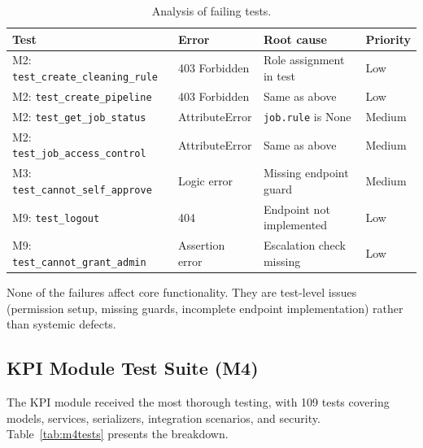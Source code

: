 \begin{table}[h!]
\centering
\caption{Analysis of failing tests.}
\label{tab:failures}
\small
\renewcommand{\arraystretch}{1.3}
\begin{tabular}{|l|l|l|l|}
\hline
\textbf{Test} & \textbf{Error} & \textbf{Root cause} & \textbf{Priority} \\
\hline
M2: \texttt{test\_create\_cleaning\_rule} & 403 Forbidden & Role assignment in test & Low \\
M2: \texttt{test\_create\_pipeline} & 403 Forbidden & Same as above & Low \\
M2: \texttt{test\_get\_job\_status} & AttributeError & \texttt{job.rule} is None & Medium \\
M2: \texttt{test\_job\_access\_control} & AttributeError & Same as above & Medium \\
M3: \texttt{test\_cannot\_self\_approve} & Logic error & Missing endpoint guard & Medium \\
M9: \texttt{test\_logout} & 404 & Endpoint not implemented & Low \\
M9: \texttt{test\_cannot\_grant\_admin} & Assertion error & Escalation check missing & Low \\
\hline
\end{tabular}
\end{table}

\noindent
None of the failures affect core functionality.
They are test-level issues (permission setup,
missing guards, incomplete endpoint implementation)
rather than systemic defects.

\subsection{KPI Module Test Suite (M4)}

\noindent
The KPI module received the most thorough testing,
with 109 tests covering models, services, serializers,
integration scenarios, and security.
Table~\ref{tab:m4tests} presents the breakdown.

